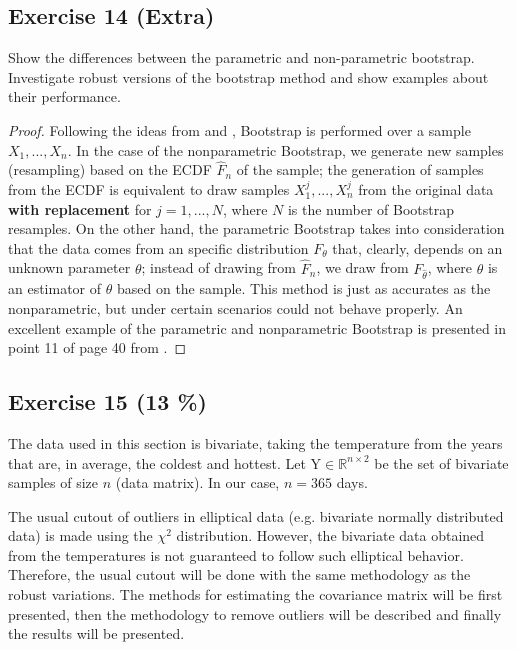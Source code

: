 \documentclass[11pt]{article}
\theoremstyle{definition}
\theoremstyle{remark}
\theoremstyle{remark}
\begin{document}
\subsection*{Exercise 14 (Extra)}
Show the differences between the parametric and non-parametric
bootstrap. Investigate robust versions of the bootstrap method and
show examples about their performance.

\begin{proof}
  Following the ideas from \cite{wasserman2006} and
  \cite{kulperger2018}, Bootstrap is performed over a sample
  $X_1,...,X_n$. In the case of the nonparametric Bootstrap, we
  generate new samples (resampling) based on the ECDF $\hat{F}_n$ of
  the sample; the generation of samples from the ECDF is equivalent to
  draw samples $X_1^j,...,X_n^j$ from the original data \textbf{with
    replacement} for $j=1,...,N$, where $N$ is the number of Bootstrap
  resamples. On the other hand, the parametric Bootstrap takes into
  consideration that the data comes from an specific distribution
  $F_\theta$ that, clearly, depends on an unknown parameter $\theta$;
  instead of drawing from $\hat{F}_n$, we draw from
  $F_{\hat{\theta}}$, where $\hat{\theta}$ is an estimator of $\theta$
  based on the sample. This method is just as accurates as the
  nonparametric, but under certain scenarios could not behave
  properly. An excellent example of the parametric and nonparametric
  Bootstrap is presented in point 11 of page 40 from
  \cite{wasserman2006}.

\end{proof}

\subsection*{Exercise 15 (13 \%)}
The data used in this section is bivariate, taking the temperature
from the years that are, in average, the coldest and hottest. Let
$\boldsymbol{\mathrm{Y}}\in\mathbb{R}^{n\times2}$ be the set of
bivariate samples of size $n$ (data matrix). In our case, $n=365$
days.


The usual cutout of outliers in elliptical data (e.g. bivariate
normally distributed data) is made using the $\chi^2$
distribution. However, the bivariate data obtained from the
temperatures is not guaranteed to follow such elliptical
behavior. Therefore, the usual cutout will be done with the same
methodology as the robust variations. The methods for estimating the
covariance matrix will be first presented, then the methodology to
remove outliers will be described and finally the results will be
presented.
\end{document}
